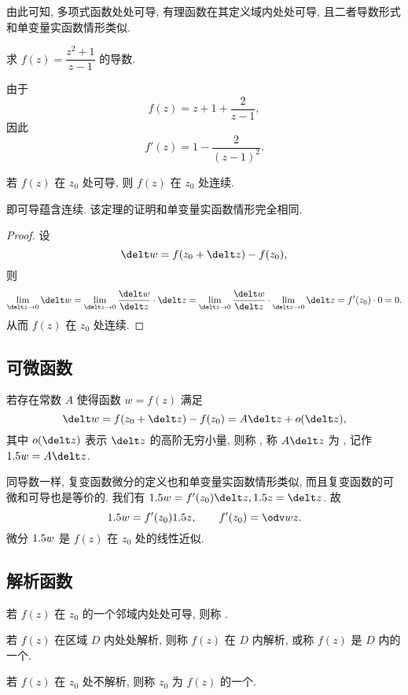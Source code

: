 由此可知, 多项式函数处处可导, 有理函数在其定义域内处处可导, 且二者导数形式和单变量实函数情形类似.

\begin{example}
  求 $f(z)=\dfrac{z^2+1}{z-1}$ 的导数.
\end{example}
\begin{solution}
  由于
  \[
    f(z)=z+1+\frac2{z-1},
  \]
  因此
  \[
    f'(z)=1-\frac2{(z-1)^2}.
  \]
\end{solution}

\begin{theorem}
  若 $f(z)$ 在 $z_0$ 处可导, 则 $f(z)$ 在 $z_0$ 处连续.
\end{theorem}

即可导蕴含连续. 该定理的证明和单变量实函数情形完全相同.

\begin{proof}
  设
  \[
    \delt w=f(z_0+\delt z)-f(z_0),
  \]
  则
  \[
    \lim_{\delt z\ra 0}\delt w
    =\lim_{\delt z\ra 0}\frac{\delt w}{\delt z}\cdot\delt z
    =\lim_{\delt z\ra 0}\frac{\delt w}{\delt z}
      \cdot\lim_{\delt z\ra 0}\delt z
    =f'(z_0)\cdot 0=0.
  \]
  从而 $f(z)$ 在 $z_0$ 处连续.
\end{proof}


\subsection{可微函数}

\begin{definition}
  若存在常数 $A$ 使得函数 $w=f(z)$ 满足
  \[
     \delt w
    =f(z_0+\delt z)-f(z_0)
    =A\delt z+o(\delt z),
  \]
  其中 $o(\delt z)$ 表示 $\delt z$ 的高阶无穷小量, 则称 , 称 $A\delt z$ 为 , 记作 $\d w=A \delt z$.
\end{definition}

同导数一样, 复变函数微分的定义也和单变量实函数情形类似, 而且复变函数的可微和可导也是等价的.
我们有 $\d w=f'(z_0)\delt z, \d z=\delt z$.
故
\[
  \d w=f'(z_0)\d z,\qquad 
  f'(z_0)=\odv wz.
\]
微分 $1.5 w$ 是 $f(z)$ 在 $z_0$ 处的线性近似.


\subsection{解析函数}

\begin{definition}
  \begin{enuma}
    \item 若 $f(z)$ 在 $z_0$ 的一个邻域内处处可导, 则称 .
    \item 若 $f(z)$ 在区域 $D$ 内处处解析, 则称 $f(z)$ 在 $D$ 内解析, 或称 $f(z)$ 是 $D$ 内的一个.\footnotemark
    \item 若 $f(z)$ 在 $z_0$ 处不解析, 则称 $z_0$ 为 $f(z)$ 的一个.
  \end{enuma}
\end{definition}

